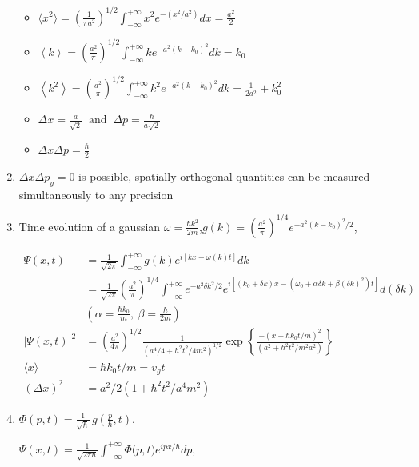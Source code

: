 \documentclass{article}
\theoremstyle{remark}
\theoremstyle{remark}
\begin{document}
\begin{enumerate}
\begin{itemize}
        \item $\langle x^{2}\rangle=\left(\frac{1}{\pi a^{2}}\right)^{1/2}\int_{-\infty}^{+\infty}x^{2}e^{-(x^{2}/a^{2})}d x=\frac{a^2}{2}$
        \item $\left\langle k\right\rangle=\left(\frac{a^{2}}{\pi}\right)^{1/2}\int_{-\infty}^{+\infty}k e^{-a^{2}(k-k_{0})^{2}}d k=k_{0}$
        \item $\left\langle k^{2}\right\rangle=\left(\frac{a^{2}}{\pi}\right)^{1/2}\int_{-\infty}^{+\infty}k^{2}e^{-a^{2}(k-k_{0})^{2}}d k=\frac{1}{2a^{2}}+k_{0}^{2}$
        \item $\Delta x={\frac{a}{\sqrt{2}}}\;\;\mathrm{and}\;\;\Delta p={\frac{\hbar}{a\sqrt{2}}}$
        \item $\Delta x\Delta p={\frac{\hbar}{2}}$
    \end{itemize}
    \item $\Delta x\Delta p_y=0$ is possible, spatially orthogonal quantities can be measured simultaneously to any precision
    \item Time evolution of a gaussian $\omega=\frac{\hbar k^2}{2m}$,$g(k)=\left(\frac{a^{2}}{\pi}\right)^{1/4}e^{-a^{2}(k-k_{0})^{2}/2}$, 
    
    \begin{align*}
        \Psi(x,t)&={\frac{1}{\sqrt{2\pi}}}\int_{-\infty}^{+\infty}g(k)e^{i\left[k x-\omega(k)t\right]}d k \\
                 &=\frac{1}{\sqrt{2\pi}}\left(\frac{a^{2}}{\pi}\right)^{1/4}\int_{-\infty}^{+\infty}e^{-a^{2}\delta k^{2}/2}e^{i\left[(k_{0}+\delta k)x-\left(\omega_{0}+\alpha\delta k+\beta(\delta k)^{2}\right)t\right]}d(\delta k)\\
                 &\left(\alpha=\frac{\hbar k_0}{m},\ \beta=\frac{\hbar}{2m}\right)\\
        |\Psi(x,t)|^2 &= \left(\frac{a^{2}}{4\pi}\right)^{1/2}\frac{1}{(a^{4}/4+h^{2}t^{2}/4m^{2})^{1/2}}\exp\left\{\frac{-(x-\hbar k_{0}t/m)^{2}}{(a^{2}+h^{2}t^{2}/m^{2}a^{2})}\right\}\\
        \langle x\rangle &= \hbar k_0t/m = v_g t\\
        (\Delta x)^2 &= a^2/2(1+\hbar^2t^2/a^4m^2)
    \end{align*}

    \item $\Phi(p,t)={\frac{1}{\sqrt{\hbar}}}\,g\left({\frac{p}{\hbar}},t\right)$, 
    
        $\Psi(x,t)=\frac{1}{\sqrt{2\pi\hbar}}\int_{-\infty}^{+\infty}\Phi\bigl(p,t\bigr)e^{i p x/\hbar}d p$, 
    

\end{enumerate}
\end{document}
